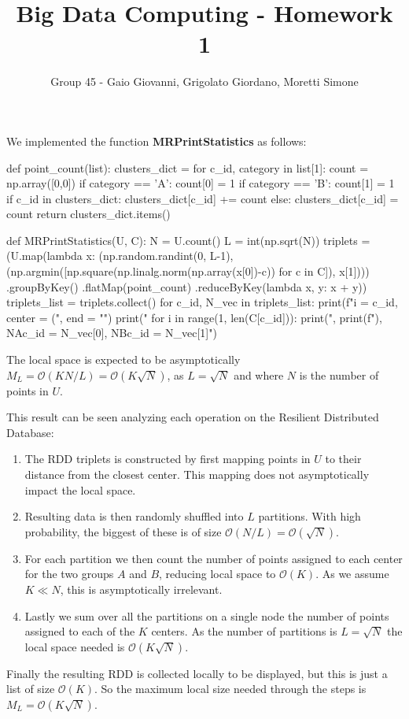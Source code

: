 \documentclass[12pt,a4paper]{article}
\title{Big Data Computing - Homework 1}
\author{Group 45 - Gaio Giovanni, Grigolato Giordano, Moretti Simone}
\date{}
\begin{document}
\maketitle    
We implemented the function \textbf{MRPrintStatistics} as follows:
\begin{python}
def point_count(list):
    clusters_dict = {}
    for c_id, category in list[1]:
        count = np.array([0,0])
        if category == 'A': count[0] = 1
        if category == 'B': count[1] = 1
        if c_id in clusters_dict: clusters_dict[c_id] += count
        else: clusters_dict[c_id] = count
    return clusters_dict.items()

def MRPrintStatistics(U, C):
    N = U.count()
    L = int(np.sqrt(N))
    triplets = (U.map(lambda x: (np.random.randint(0, L-1), (np.argmin([np.square(np.linalg.norm(np.array(x[0])-c)) for c in C]), x[1])))
                 .groupByKey()
                 .flatMap(point_count)
                 .reduceByKey(lambda x, y: x + y))
    triplets_list = triplets.collect()
    for c_id, N_vec in triplets_list:
        print(f"i = {c_id}, center = (", end = "")
        print("%
        for i in range(1, len(C[c_id])):
            print(",%
        print(f"), NA{c_id} = {N_vec[0]}, NB{c_id} = {N_vec[1]}")
\end{python}
The local space is expected to be asymptotically $M_L = \mathcal{O}(KN/L) = \mathcal{O}(K\sqrt{N})$, as $L = \sqrt{N}$ and where $N$ is the number of points in $U$.

This result can be seen analyzing each operation on the Resilient Distributed Database:
\begin{enumerate}
    \item The RDD triplets is constructed by first mapping points in $U$ to their distance from the closest center.
    This mapping does not asymptotically impact the local space.
    \item Resulting data is then randomly shuffled into $L$ partitions. With high probability, the biggest of these is of size $\mathcal{O}(N/L) = \mathcal{O}(\sqrt{N})$.
    \item For each partition we then count the number of points assigned to each center for the two groups $A$ and $B$, reducing local space to $\mathcal{O}(K)$. As we assume $K \ll N$, this is asymptotically irrelevant.
    \item Lastly we sum over all the partitions on a single node the number of points assigned to each of the $K$ centers. As the number of partitions is $L = \sqrt{N}$ the local space needed is $\mathcal{O}(K\sqrt{N})$.
\end{enumerate}
Finally the resulting RDD is collected locally to be displayed, but this is just a list of size $\mathcal{O}(K)$. So the maximum local size needed through the steps is $M_L = \mathcal{O}(K\sqrt{N})$.
\end{document}
